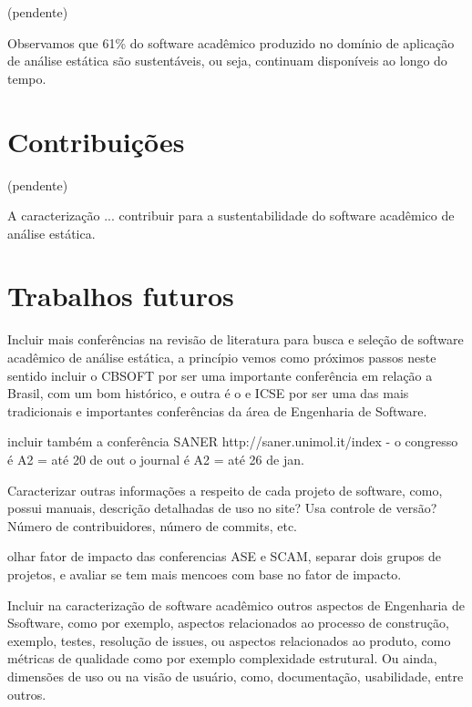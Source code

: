 \label{conclusoes}

(pendente)

Observamos que 61\% do software acadêmico produzido no domínio de aplicação de
análise estática são sustentáveis, ou seja, continuam disponíveis ao longo do
tempo.

\section{Contribuições}

(pendente)

A caracterização ... contribuir para a sustentabilidade do software acadêmico
de análise estática.

\section{Trabalhos futuros}

Incluir mais conferências na revisão de literatura para busca e seleção de
software acadêmico de análise estática, a princípio vemos como próximos passos
neste sentido incluir o CBSOFT por ser uma importante conferência em relação a
Brasil, com um bom histórico, e outra é o e ICSE por ser uma das mais
tradicionais e importantes conferências da área de Engenharia de Software.

incluir também a conferência SANER http://saner.unimol.it/index -
 o congresso é A2 = até 20 de out
 o journal é A2 = até 26 de jan.

Caracterizar outras informações a respeito de cada projeto de software, como,
possui manuais, descrição detalhadas de uso no site? Usa controle de versão?
Número de contribuidores, número de commits, etc.

olhar fator de impacto das conferencias ASE e SCAM, separar dois grupos de
projetos, e avaliar se tem mais mencoes com base no fator de impacto.

Incluir na caracterização de software acadêmico outros aspectos de Engenharia
de Ssoftware, como por exemplo, aspectos relacionados ao processo de
construção, exemplo, testes, resolução de issues, ou aspectos relacionados ao
produto, como métricas de qualidade como por exemplo complexidade estrutural.
Ou ainda, dimensões de uso ou na visão de usuário, como, documentação,
usabilidade, entre outros.


